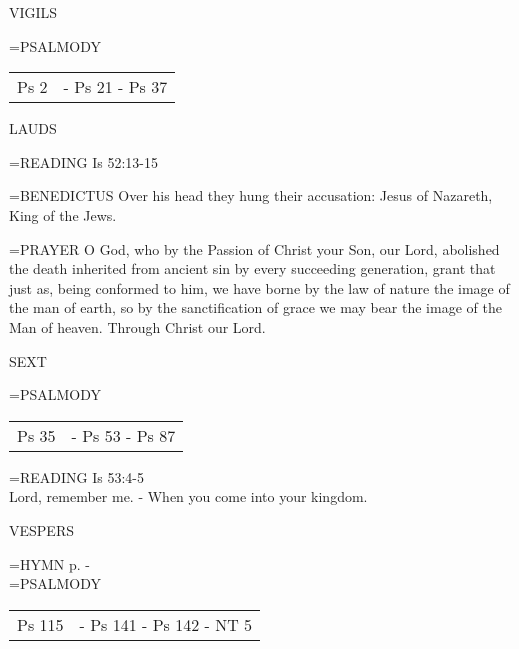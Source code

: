 \begin{flushleft}\normalsize VIGILS\\\end{flushleft}
\hangindent=\parindent \small{PSALMODY}
\begin{center}
\begin{tabular}{ l l }
Ps 2 &  - Ps 21 - Ps 37\\
\end{tabular}
\end{center}		

\begin{flushleft}\normalsize LAUDS\\\end{flushleft}
\hangindent=\parindent \small{\uppercase{READING}}    Is 52:13-15 \textbf{   \\}

\hangindent=\parindent \small{BENEDICTUS 	Over his head they hung their accusation: Jesus of Nazareth, King of the Jews.\\}

\hangindent=\parindent \small{PRAYER 	O God, who by the Passion of Christ your Son, our Lord, abolished the death inherited from ancient sin by every succeeding generation, grant that just as, being conformed to him, we have borne by the law of nature the image of the man of earth, so by the sanctification of grace we may bear the image of the Man of heaven. Through Christ our Lord.}

\begin{flushleft}\normalsize SEXT\\\end{flushleft}
\hangindent=\parindent \small{PSALMODY}
\begin{center}
\begin{tabular}{ l l }
Ps 35 &  - Ps 53 - Ps 87\\
\end{tabular}
\end{center}		

\hangindent=\parindent \small{\uppercase{READING}}    Is 53:4-5 \textbf{   \\}
Lord, remember me.
- When you come into your kingdom.

\begin{flushleft}\normalsize VESPERS\\\end{flushleft}
\hangindent=\parindent \small{\uppercase{HYMN} p. \pageref{lent:firstHymn}-\pageref{lent:lastHymn}\\}
\hangindent=\parindent \small{PSALMODY}
\begin{center}
\begin{tabular}{ l l }
Ps 115 &  - Ps 141 - Ps 142 - NT 5\\
\end{tabular}
\end{center}		

